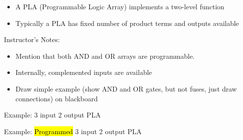 \setlength{\columnseprule}{1pt}
\def\columnseprulecolor{\color{blue}}


\begin{frame}[fragile]
\begin{itemize}
	\item A PLA (Programmable Logic Array) implements a two-level
	function
	
	\item Typically a PLA has fixed number of product terms and outputs available
\end{itemize}
\end{frame}
\BNotes\ifnum{}
\begin{frame}[fragile]
Instructor's Notes:
\begin{itemize}
	\item Mention that both AND and OR arrays are programmable.
	\item Internally, complemented inputs are available
	\item Draw simple example (show AND and OR gates, but not fuses,
		just draw connections) on blackboard
\end{itemize}
\end{frame}
\fi\ENotes

\begin{frame}{Example: 3 input 2 output PLA}
\resizebox{8cm}{8cm}{
    
    }
\end{frame}

\begin{frame}{Example: \hl{Programmed} 3 input 2 output PLA}
\end{frame}



